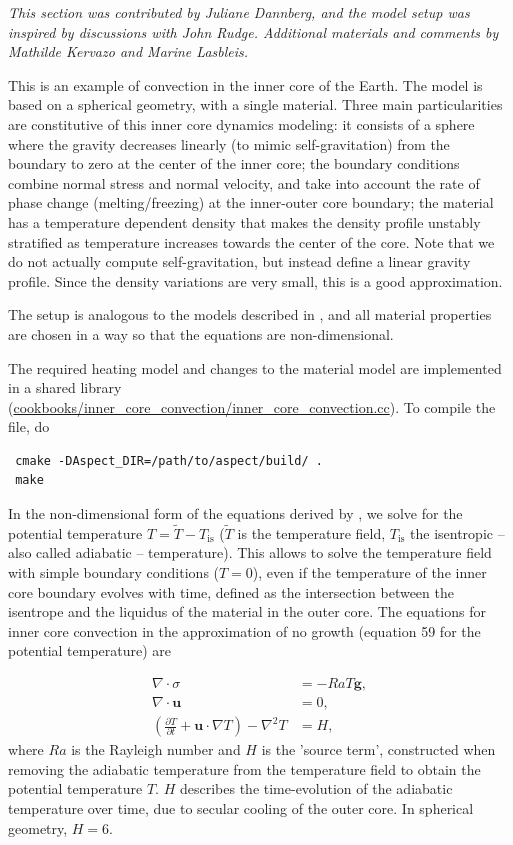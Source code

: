 \documentclass{article}
\begin{document}
\textit{This section was contributed by Juliane Dannberg, and the model setup was inspired
by discussions with John Rudge. Additional materials and comments by Mathilde Kervazo and Marine Lasbleis.}

This is an example of convection in the inner core of the Earth. The model is based on a spherical geometry, with a single material. Three main particularities are constitutive of this inner core dynamics modeling: it consists of a sphere where the gravity decreases linearly (to mimic self-gravitation) from the boundary to zero at the center of the inner core; the boundary conditions combine normal stress and normal velocity, and take into account the rate of phase change (melting/freezing) at the inner-outer core boundary; the material has a temperature dependent density that makes the density profile unstably stratified as temperature increases towards the center of the core.
Note that we do not actually compute self-gravitation, but instead define a linear gravity profile. Since the density variations are very small, this is a good approximation.

The setup is analogous to the models described in \cite{Deguen2013}, and all material properties
are chosen in a way so that the equations are non-dimensional.

The required heating model and changes to the material model are implemented in a shared library
(\url{cookbooks/inner_core_convection/inner_core_convection.cc}). To compile the file, do

\begin{verbatim}
 cmake -DAspect_DIR=/path/to/aspect/build/ .
 make
\end{verbatim}

In the non-dimensional form of the equations derived by \cite{Deguen2013}, we solve for the potential temperature $T = \tilde{T}-T_{\text{is}}$ ($\tilde{T}$ is the temperature field, $T_{\text{is}}$ the isentropic -- also called adiabatic -- temperature). This allows to solve the temperature field with simple boundary conditions ($T=0$), even if the temperature of the inner core boundary evolves with time, defined as the intersection between the isentrope and the liquidus of the material in the outer core.
The equations for inner core convection in the approximation of no growth (equation 59 for the potential temperature) are

\begin{align}
  \label{eq:inner-core-1}
  \nabla \cdot \sigma &=
  -Ra T \mathbf g,
  \\
  \label{eq:inner-core-2}
  \nabla \cdot \mathbf u &= 0,
  \\
  \label{eq:inner-core-3}
  \left(\frac{\partial T}{\partial t} + \mathbf u\cdot\nabla T\right)
  - \nabla^2 T
  &=
  H,
\end{align}
where $Ra$ is the Rayleigh number and $H$ is the 'source term', constructed when removing the adiabatic temperature from the temperature field to obtain the potential temperature $T$. $H$ describes the time-evolution of the adiabatic temperature over time, due to secular cooling of the outer core.
In spherical geometry, $H=6$.
\end{document}
